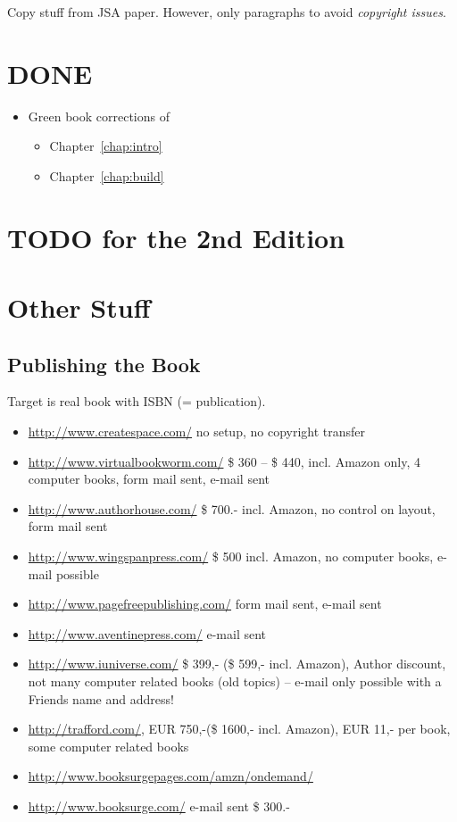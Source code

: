 Copy stuff from JSA paper. However, only paragraphs to avoid
\emph{copyright issues}.

\chapter{DONE}

\begin{itemize}
  \item Green book corrections of
  \begin{itemize}
    \item Chapter~\ref{chap:intro}
    \item Chapter~\ref{chap:build}
  \end{itemize}
\end{itemize}

\chapter{TODO for the 2nd Edition}

\chapter{Other Stuff}

\section{Publishing the Book}

Target is real book with ISBN (= publication).

\begin{itemize}
    \item \url{http://www.createspace.com/} no setup, no
        copyright transfer
    \item \url{http://www.virtualbookworm.com/} \$ 360 -- \$ 440, incl. Amazon only, 4 computer
    books, form mail sent, e-mail sent
    \item \url{http://www.authorhouse.com/} \$ 700.- incl. Amazon,
    no control on layout, form mail sent
    \item \url{http://www.wingspanpress.com/} \$ 500 incl. Amazon,
    no computer books, e-mail possible
    \item \url{http://www.pagefreepublishing.com/} form mail sent,
    e-mail sent
    \item \url{http://www.aventinepress.com/} e-mail sent
    \item \url{http://www.iuniverse.com/} \$ 399,- (\$ 599,- incl.
    Amazon), Author discount, not many computer related books (old
    topics) -- e-mail only possible with a Friends name and address!
    \item \url{http://trafford.com/}, EUR 750,-(\$ 1600,- incl. Amazon), EUR 11,- per
    book, some computer related books
    \item \url{http://www.booksurgepages.com/amzn/ondemand/}
    \item \url{http://www.booksurge.com/} e-mail sent \$ 300.-
\end{itemize}


